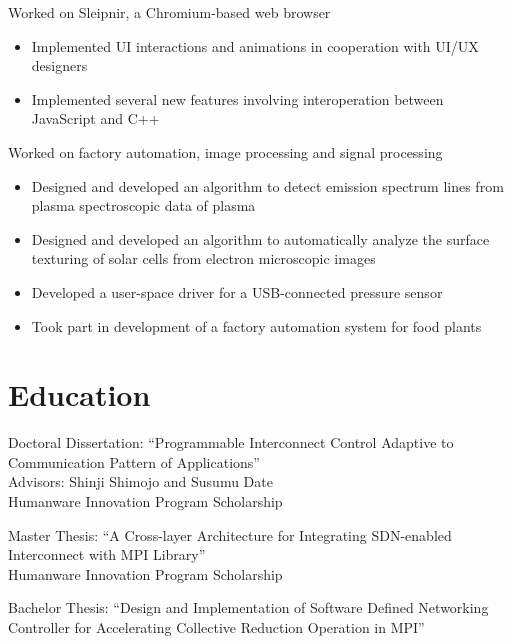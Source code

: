 \documentclass[10pt,a4paper,sans]{moderncv}
\begin{document}
%
{Worked on Sleipnir, a Chromium-based web browser%
\begin{itemize}%
\item Implemented UI interactions and animations in cooperation with UI/UX designers
\item Implemented several new features involving interoperation between
    JavaScript and C++
\end{itemize}}

%
{Worked on factory automation, image processing and signal processing%
\begin{itemize}%
\item Designed and developed an algorithm to detect emission spectrum lines
    from plasma spectroscopic data of plasma
\item Designed and developed an algorithm to automatically analyze the
    surface texturing of solar cells from electron microscopic images
\item Developed a user-space driver for a USB-connected pressure sensor
\item Took part in development of a factory automation system for food plants
\end{itemize}}

\newpage

\section{Education}

%
{Doctoral Dissertation: ``Programmable Interconnect Control Adaptive to Communication Pattern of Applications''\\%
Advisors: Shinji Shimojo and Susumu Date\\%
Humanware Innovation Program Scholarship}

%
{Master Thesis: ``A Cross-layer Architecture for Integrating SDN-enabled
Interconnect with MPI Library''\\%
Humanware Innovation Program Scholarship}

%
{Bachelor Thesis: ``Design and Implementation of Software Defined Networking Controller for Accelerating Collective Reduction Operation in MPI''}
\end{document}
